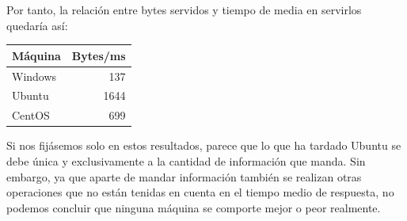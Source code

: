 \begin{itemize}
	Por tanto, la relación entre bytes servidos y tiempo de media en servirlos quedaría así:\\
	
	\begin{center}
		\begin{tabular}{| l || r | }
			\hline
			Máquina & Bytes/ms\\ \hline \hline
			Windows  & 137 \\ \hline
			Ubuntu & 1644 \\ \hline
			CentOS & 699 \\
			\hline
		\end{tabular}
	\end{center}
	
	Si nos fijásemos solo en estos resultados, parece que lo que ha tardado Ubuntu se debe única y exclusivamente a la cantidad de información que manda. Sin embargo, ya que aparte de mandar información también se realizan otras operaciones que no están tenidas en cuenta en el tiempo medio de respuesta, no podemos concluir que ninguna máquina se comporte mejor o peor realmente.
\end{itemize}

